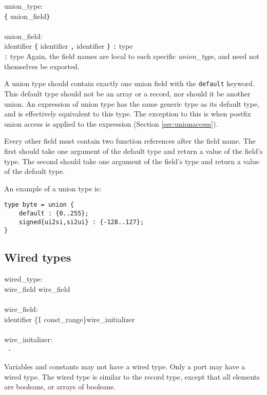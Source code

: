 \grammarstart
union\_type: \\
       \verb|{| union\_field\TSEQ \verb|}| \\
 \\
union\_field: \\
       \>identifier \verb|{| identifier {\tt{},} identifier \verb|}| {\tt{}:} type \\
\orbox {} {\tt{}:} type
\grammarend
Again, the field names are local to each specific {\it{}union\_type}, and need
not themselves be exported.

A union type should contain exactly one union field with the {\tt{}default}
keyword.  This default type should not be an array or a record, nor should
it be another union.  An expression of union type has the same generic type
as its default type, and is effectively equivalent to this type.  The exception
to this is when postfix union access is applied to the expression
(Section \ref{sec:unionaccess}).

Every other field must contain two function references after the field name.
The first should take one argument of the default type and return a value of
the field's type.  The second should take one argument of the field's type
and return a value of the default type.

An example of a union type is:
\begin{verbatim}
type byte = union {
    default : {0..255};
    signed{ui2si,si2ui} : {-128..127};
}
\end{verbatim}

\subsection{Wired types}\label{sec:wired}

\grammarstart
wired\_type: \\
      \>{\tt{}(} wire\_field\LIST {\tt{};} wire\_field\LIST {\tt{})} \\
 \\
wire\_field: \\
      \>identifier \{{\tt{}[} const\_range\LIST {\tt{}]}\}\OPT wire\_initializer\OPT \\
 \\
wire\_initalizer: \\
      \>{\tt{}+} \orbox \ {\tt{}-}
\grammarend

Variables and constants may not have a wired type.  Only a port may have a
wired type.  The wired type is similar to the record type, except that all
elements are booleans, or arrays of booleans.

